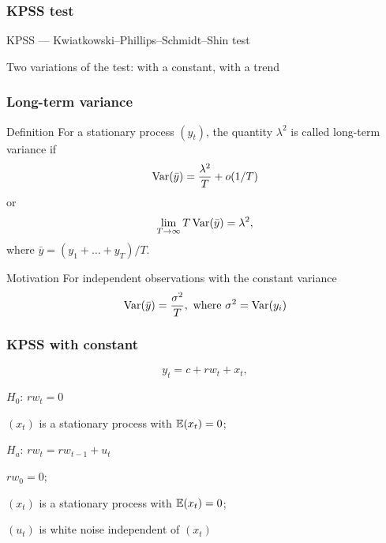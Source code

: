 \begin{frame}
	\frametitle{KPSS test}
	
	KPSS — \alert{Kwiatkowski–Phillips–Schmidt–Shin} test
	
	\pause
	Two variations of the test: with a constant, with a trend
	
\end{frame}


\begin{frame}
	\frametitle{Long-term variance}
	
	\begin{block}{Definition}
		For a stationary process $(y_t)$, the quantity $\lambda^2$ is called \alert{long-term variance} if
		\[
		\operatorname{Var}(\bar y) = \frac{\lambda^2}{T} + o(1/T)
		\]
		or
		\[
		\lim_{T \to \infty} T \operatorname{Var}(\bar y) = \lambda^2,
		\]
		where $\bar y = (y_1 + \ldots + y_T) / T$.
	\end{block}
	
	\pause
	
	\begin{block}{Motivation}
		For independent observations with the constant  variance
		\[
		\operatorname{Var}(\bar y) = \frac{\sigma^2}{T},\text{ where }\sigma^2 = \operatorname{Var}(y_i)
		\]
	\end{block}
	
\end{frame}


\begin{frame}
	\frametitle{KPSS with constant}
	\[
	y_t = c + rw_t + x_t,
	\]
	
	\pause
	
	\alert{$H_0$: $rw_t = 0$}
	
	$(x_t)$ is a stationary process with $\mathbb{E}(x_t) = 0$;
	
	\pause
	
	\alert{$H_a$: $rw_t = rw_{t-1} + u_t$}
	
	$rw_0 = 0$;
	
	$(x_t)$ is a stationary process with $\mathbb{E}(x_t) = 0$;
	
	$(u_t)$ is white noise independent of $(x_t)$
	
\end{frame}

